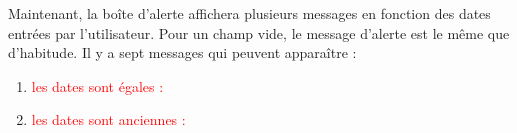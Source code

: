 \documentclass{article}
\begin{document}
\begin{enumerate}
               \vspace{0.7cm}
               \hspace*{-0.7in}
               \noindent{}
  
  
  
  
  Maintenant, la boîte d'alerte affichera plusieurs messages en fonction des dates entrées par l'utilisateur. Pour un champ vide, le message d'alerte est le même que d'habitude. Il y a sept messages qui peuvent apparaître :
  
  \begin{enumerate}
 
 
  \item \textcolor{red}{les dates sont égales :} 
  \vspace{0.7cm}
               \hspace*{-0.7in}

               \noindent{}
  \item \textcolor{red}{les dates sont anciennes :} 
  \vspace{0.7cm}
               \hspace*{-0.7in}


\end{enumerate}
\end{enumerate}
\end{document}
